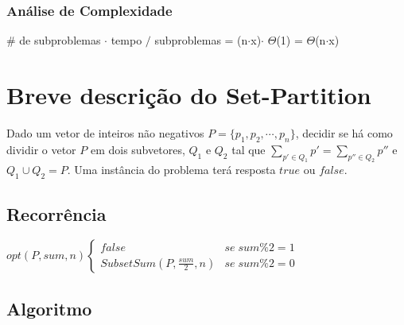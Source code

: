 \documentclass[12pt]{article}
\begin{document}
\begin{algorithm}[H]
\end{algorithm}

\subsubsection{Análise de Complexidade}

\# de subproblemas $\cdot$ tempo $/$ subproblemas = (n$\cdot$x)$\cdot$ $\Theta$(1) = $\Theta$(n$\cdot$x)

\section{Breve descrição do Set-Partition}

Dado um vetor de inteiros não negativos $P = \{p_1, p_2, \cdots, p_n\}$, decidir se há como dividir o vetor $P$ em dois subvetores, $Q_1$ e $Q_2$ tal que $\displaystyle\sum_{p' \in Q_1} p' = \displaystyle\sum_{p'' \in Q_2} p''$ e $Q_1 \cup Q_2 = P$. Uma instância do problema terá resposta $true$ ou $false$.

\subsection{Recorrência}

$opt(P,sum,n)\left\{\begin {matrix}
false & se\;sum\% 2 = 1\\
SubsetSum(P,\frac{sum}{2},n) & se\;sum\% 2 = 0
\end{matrix}\right.$

\subsection{Algoritmo}

\begin{algorithm}[H]
\end{algorithm}
\end{document}
